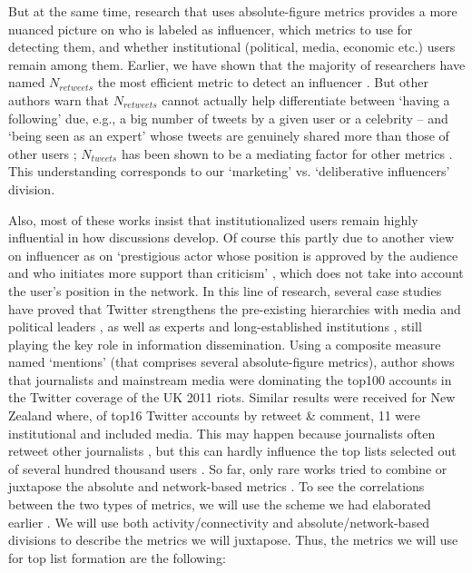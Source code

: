 But at the same time, research that uses absolute-figure metrics provides a more nuanced picture on who is labeled as influencer, which metrics to use for detecting them, and whether institutional (political, media, economic etc.) users remain among them. Earlier, we have shown that the majority of researchers have named \(N_{retweets}\) the most efficient metric to detect an influencer \cite{BodrunovaLitvinenkoBlekanov2016}. But other authors warn that \(N_{retweets}\) cannot actually help differentiate between ‘having a following’ due, e.g., a big number of tweets by a given user or a celebrity -- and ‘being seen as an expert’ whose tweets are genuinely shared more than those of other users \cite[p.~1263]{DuboisGaffney}; \(N_{tweets}\) has been shown to be a mediating factor for other metrics \cite{Jungherr}. This understanding corresponds to our ‘marketing’ vs. ‘deliberative influencers’ division.

Also, most of these works insist that institutionalized users remain highly influential in how discussions develop. Of course this partly due to another view on influencer as on ‘prestigious actor whose position is approved by the audience and who initiates more support than criticism’ \cite{Adam}, which does not take into account the user’s position in the network. In this line of research, several case studies have proved that Twitter strengthens the pre-existing hierarchies with media and political leaders \cite{WuHofmanMason,VaccariValerianiBarbera,JungherrJuergens}, as well as experts and long-established institutions \cite{FoxZickuhrSmith,Page}, still playing the key role in information dissemination. Using a composite measure named ‘mentions’ (that comprises several absolute-figure metrics), author \cite{Vis} shows that journalists and mainstream media were dominating the top100 accounts in the Twitter coverage of the UK 2011 riots. Similar results were received for New Zealand \cite{Bruns2014} where, of top16 Twitter accounts by retweet \& comment, 11 were institutional and included media. This may happen because journalists often retweet other journalists \cite{LotanGraeffAnanny}, but this can hardly influence the top lists selected out of several hundred thousand users
.
So far, only rare works tried to combine or juxtapose the absolute and network-based metrics \cite{BodrunovaLitvinenkoBlekanov2016,Adam,GruzdRoy,XuSangBlasiola}. To see the correlations between the two types of metrics, we will use the scheme we had elaborated earlier \cite{BodrunovaLitvinenkoBlekanov2016}. We will use both activity/connectivity and absolute/network-based divisions to describe the metrics we will juxtapose. Thus, the metrics we will use for top list formation are the following:


